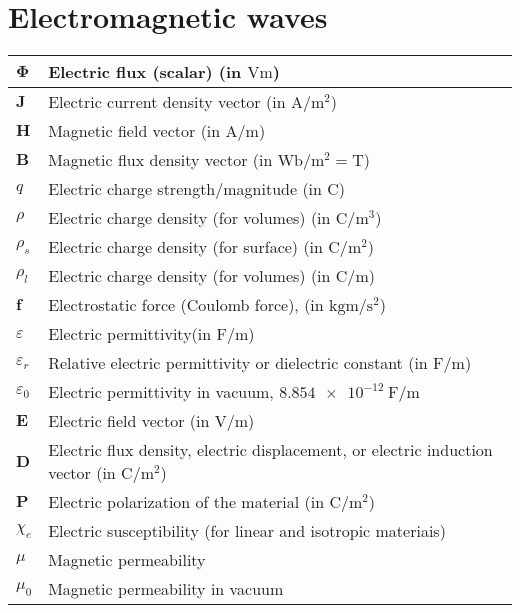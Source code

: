 \documentclass{article}
\begin{document}
\section{Electromagnetic waves}
\begin{xltabular}{\textwidth}{XX}
    \(\mathbf{\Phi}\) & Electric flux (scalar) (in \(\si{\volt\meter}\))\\ \hline
    \(\mathbf{J}\) & Electric current density vector (in \(\si{\ampere\per\square\meter}\))\\ \hline
    \(\mathbf{H}\) & Magnetic field vector (in \(\si{\ampere\per\meter}\))\\ \hline
    \(\mathbf{B}\) & Magnetic flux density vector (in \(\si{\weber\per\meter\squared} = \si{\tesla}\))\\ \hline
    \(q\) & Electric charge strength/magnitude (in \(\si{\coulomb}\)) \\ \hline
    \(\rho\) & Electric charge density (for volumes) (in \(\si{\coulomb\per\meter^3}\)) \\ \hline
    \(\rho_s\) & Electric charge density (for surface) (in \(\si{\coulomb\per\meter^2}\)) \\ \hline
    \(\rho_l\) & Electric charge density (for volumes) (in \(\si{\coulomb\per\meter}\)) \\ \hline
    \(\mathbf{f}\) & Electrostatic force (Coulomb force), (in \(\si{\kilo\gram\meter\per\second\squared}\)) \\ \hline
    \(\varepsilon\) & Electric permittivity(in \(\si{\farad\per\meter}\)) \cite{ramoFieldsWavesCommunication1994} \\ \hline
    \(\varepsilon_r\) & Relative electric permittivity or dielectric constant (in \(\si{\farad\per\meter}\)) \cite{ramoFieldsWavesCommunication1994} \\ \hline
    \(\varepsilon_0\) & Electric permittivity in vacuum, \(\SI{8.854e-12}{\farad\per\meter}\) \cite{ramoFieldsWavesCommunication1994} \\ \hline
    \(\mathbf{E}\) & Electric field vector (in \(\si{\volt\per\meter}\))\\ \hline
    \(\mathbf{D}\) & Electric flux density, electric displacement, or electric induction vector (in \(\si{\coulomb\per\meter\squared}\))\\ \hline
    \(\mathbf{P}\) & Electric polarization of the material (in \(\si{\coulomb\per\meter\squared}\))\\ \hline
    \(\chi_e\) & Electric susceptibility (for linear and isotropic materiais)\\ \hline
    \(\mu\) & Magnetic permeability \\ \hline
    \(\mu_0\) & Magnetic permeability in vacuum \\
\end{xltabular}
\end{document}
